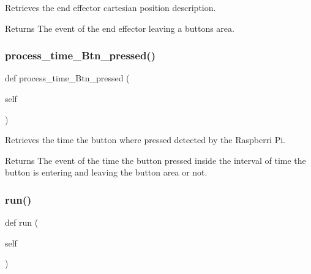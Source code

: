 Retrieves the end effector cartesian position description. 

\begin{DoxyReturn}{Returns}
The event of the end effector leaving a button\textquotesingle{}s area. 
\end{DoxyReturn}
\mbox{\label{classRET__data__processing_1_1RET__data__processing_af0d2380cd9fe71bf71ab9b25903cebc2}} 
\subsubsection{\texorpdfstring{process\+\_\+time\+\_\+\+Btn\+\_\+pressed()}{process\_time\_Btn\_pressed()}}
{\footnotesize\ttfamily def process\+\_\+time\+\_\+\+Btn\+\_\+pressed (\begin{DoxyParamCaption}\item[{}]{self }\end{DoxyParamCaption})}



Retrieves the time the button where pressed detected by the Raspberri Pi. 

\begin{DoxyReturn}{Returns}
The event of the time the button pressed inside the interval of time the button is entering and leaving the button area or not. 
\end{DoxyReturn}
\mbox{\label{classRET__data__processing_1_1RET__data__processing_ad22709b2e67308af35f55680d5a026e0}} 
\subsubsection{\texorpdfstring{run()}{run()}}
{\footnotesize\ttfamily def run (\begin{DoxyParamCaption}\item[{}]{self }\end{DoxyParamCaption})}



